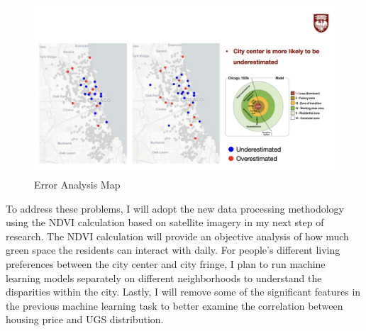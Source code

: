 \begin{figure}[h]
    \centering
    \includegraphics[width=1\textwidth]{Visual/final_map.jpeg}
    \caption{Error Analysis Map}
\end{figure}

To address these problems, I will adopt the new data processing methodology using the NDVI calculation based on satellite imagery in my next step of research. The NDVI calculation will provide an objective analysis of how much green space the residents can interact with daily. For people’s different living preferences between the city center and city fringe, I plan to run machine learning models separately on different neighborhoods to understand the disparities within the city. Lastly, I will remove some of the significant features in the previous machine learning task to better examine the correlation between housing price and UGS distribution.